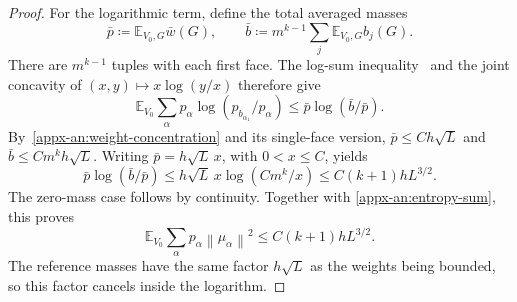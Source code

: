 \documentclass[11pt,letterpaper]{article}
\theoremstyle{remark}
\newcommand{\E}{\mathbb E}
\newcommand{\norm}[1]{\left\lVert#1\right\rVert}
\begin{document}
\begin{proof}
For the logarithmic term, define the total averaged masses
\[
 \bar p\coloneqq \E_{V_0,G}\bar w(G),\qquad
 \bar b\coloneqq m^{k-1}\sum_j\E_{V_0,G}b_j(G).
\]
There are \(m^{k-1}\) tuples with each first face. The log-sum
inequality~\cite[Theorem~2.7.1]{CoverThomas2006} and the joint concavity
of \((x,y)\mapsto x\log(y/x)\)
therefore give
\[
 \E_{V_0}\sum_\alpha p_\alpha
          \log(p_{b_{\alpha_1}}/p_\alpha)
 \le\bar p\log(\bar b/\bar p).
\]
By~\eqref{appx-an:weight-concentration} and its single-face version,
\(\bar p\le Ch\sqrt L\) and \(\bar b\le Cm^kh\sqrt L\).
Writing \(\bar p=h\sqrt L\,x\), with \(0<x\le C\), yields
\[
 \bar p\log(\bar b/\bar p)
 \le h\sqrt L\,x\log(Cm^k/x)
 \le C(k+1)hL^{3/2}.
\]
The zero-mass case follows by continuity. Together with
\eqref{appx-an:entropy-sum}, this proves
\begin{equation}
 \E_{V_0}\sum_\alpha p_\alpha\norm{\mu_\alpha}^2
 \le C(k+1)hL^{3/2}.
 \label{appx-an:tilted-mean-bound}
\end{equation}
The reference masses have the same factor \(h\sqrt L\) as the
weights being bounded, so this factor cancels inside the logarithm.


\end{proof}
\end{document}
